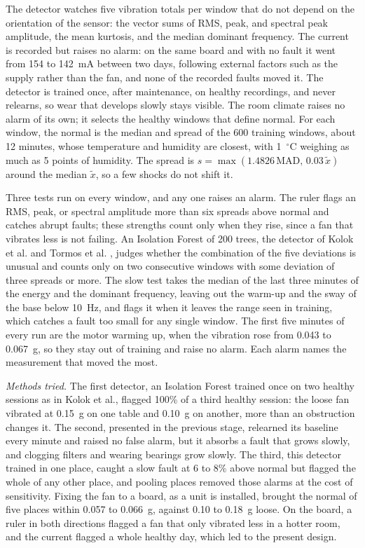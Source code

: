 \documentclass[english,hidelinks]{sbrt}
\begin{document}
The detector watches five vibration totals per window that do not depend on the orientation of the sensor: the vector sums of RMS, peak, and spectral peak amplitude, the mean kurtosis, and the median dominant frequency. The current is recorded but raises no alarm: on the same board and with no fault it went from 154 to 142~mA between two days, following external factors such as the supply rather than the fan, and none of the recorded faults moved it. The detector is trained once, after maintenance, on healthy recordings, and never relearns, so wear that develops slowly stays visible. The room climate raises no alarm of its own; it selects the healthy windows that define normal. For each window, the normal is the median and spread of the 600 training windows, about 12 minutes, whose temperature and humidity are closest, with 1~$^\circ$C weighing as much as 5 points of humidity. The spread is $s=\max(1.4826\,\mathrm{MAD},\,0.03\,\tilde{x})$ around the median $\tilde{x}$, so a few shocks do not shift it.

Three tests run on every window, and any one raises an alarm. The ruler flags an RMS, peak, or spectral amplitude more than six spreads above normal and catches abrupt faults; these strengths count only when they rise, since a fan that vibrates less is not failing. An Isolation Forest of 200 trees, the detector of Kolok et al. and Tormos et al. \cite{kolok2025lowcost,tormos2026hvacxai}, judges whether the combination of the five deviations is unusual and counts only on two consecutive windows with some deviation of three spreads or more. The slow test takes the median of the last three minutes of the energy and the dominant frequency, leaving out the warm-up and the sway of the base below 10~Hz, and flags it when it leaves the range seen in training, which catches a fault too small for any single window. The first five minutes of every run are the motor warming up, when the vibration rose from 0.043 to 0.067~g, so they stay out of training and raise no alarm. Each alarm names the measurement that moved the most.

\textit{Methods tried.} The first detector, an Isolation Forest trained once on two healthy sessions as in Kolok et al., flagged 100\% of a third healthy session: the loose fan vibrated at 0.15~g on one table and 0.10~g on another, more than an obstruction changes it. The second, presented in the previous stage, relearned its baseline every minute and raised no false alarm, but it absorbs a fault that grows slowly, and clogging filters and wearing bearings grow slowly. The third, this detector trained in one place, caught a slow fault at 6 to 8\% above normal but flagged the whole of any other place, and pooling places removed those alarms at the cost of sensitivity. Fixing the fan to a board, as a unit is installed, brought the normal of five places within 0.057 to 0.066~g, against 0.10 to 0.18~g loose. On the board, a ruler in both directions flagged a fan that only vibrated less in a hotter room, and the current flagged a whole healthy day, which led to the present design.
\end{document}
